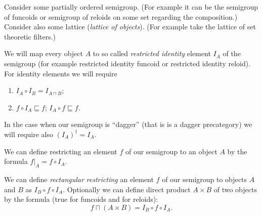 Consider some partially ordered semigroup. (For example it can be
the semigroup of funcoids or semigroup of reloids on some set regarding
the composition.) Consider also some lattice (\emph{lattice of objects}).
(For example take the lattice of set theoretic filters.)

We will map every object $A$ to so called \emph{restricted identity}
element $I_{A}$ of the semigroup (for example restricted identity
funcoid or restricted identity reloid). For identity elements we will
require
\begin{enumerate}
\item $I_{A}\circ I_{B}=I_{A\sqcap B}$;
\item $f\circ I_{A}\sqsubseteq f$; $I_{A}\circ f\sqsubseteq f$.
\end{enumerate}
In the case when our semigroup is ``dagger'' (that is is a dagger
precategory) we will require also $(I_{A})^{\dagger}=I_{A}$.

We can define restricting an element $f$ of our semigroup to an object
$A$ by the formula $f|_{A}=f\circ I_{A}$.

We can define \emph{rectangular restricting}
an element $f$ of our semigroup to objects $A$ and $B$ as $I_{B}\circ f\circ I_{A}$.
Optionally we can define direct product $A\times B$ of two objects
by the formula (true for funcoids and for reloids):
\[
f\sqcap(A\times B)=I_{B}\circ f\circ I_{A}.
\]


